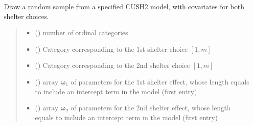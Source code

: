 \documentclass[letterpaper,10pt,english]{sphinxmanual}
\begin{document}

\begin{fulllineitems}
\label{\detokenize{cubmods:cubmods.cush2_xx.draw}}
\pysigstartsignatures
{}
\pysigstopsignatures
\sphinxAtStartPar
Draw a random sample from a specified CUSH2 model,
with covariates for both shelter choices.
\begin{quote}\begin{description}
\begin{itemize}
\item {} 
\sphinxAtStartPar
{} () \textendash{} number of ordinal categories

\item {} 
\sphinxAtStartPar
{} () \textendash{} Category corresponding to the 1st shelter choice \([1,m]\)

\item {} 
\sphinxAtStartPar
{} () \textendash{} Category corresponding to the 2nd shelter choice \([1,m]\)

\item {} 
\sphinxAtStartPar
{} () \textendash{} array \(\pmb \omega_1\) of parameters for the 1st shelter effect, whose length equals 
 to include an intercept term in the model (first entry)

\item {} 
\sphinxAtStartPar
{} () \textendash{} array \(\pmb \omega_2\) of parameters for the 2nd shelter effect, whose length equals 
 to include an intercept term in the model (first entry)


\end{itemize}
\end{description}
\end{quote}
\end{fulllineitems}
\end{document}
